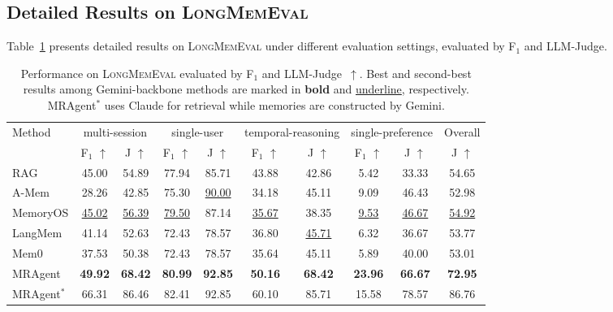 \subsection{Detailed Results on \textsc{LongMemEval}}
Table~\ref{tab:longmem-f1-j-overall} presents detailed results on \textsc{LongMemEval} under different evaluation settings, evaluated by F$_1$ and LLM-Judge.
\label{app:longmem}
\begin{table}[t]
\centering
\small
\setlength{\tabcolsep}{6pt}
\caption{Performance on \textsc{LongMemEval} evaluated by F$_1$ and LLM-Judge~$\uparrow$.
Best and second-best results among Gemini-backbone methods
are marked in \textbf{bold} and \underline{underline}, respectively. MRAgent$^{*}$ uses Claude for retrieval while memories are constructed by Gemini.}
\begin{tabular}{l|cc|cc|cc|cc|c}
\toprule
Method
& \multicolumn{2}{c|}{multi-session}
& \multicolumn{2}{c|}{single-user}
& \multicolumn{2}{c|}{temporal-reasoning}
& \multicolumn{2}{c|}{single-preference}
& Overall \\
& F$_1$ $\uparrow$ & J $\uparrow$
& F$_1$ $\uparrow$ & J $\uparrow$
& F$_1$ $\uparrow$ & J $\uparrow$
& F$_1$ $\uparrow$ & J $\uparrow$
& J $\uparrow$ \\
\midrule
RAG
& 45.00 & 54.89
& 77.94 & 85.71
& 43.88 & 42.86
& 5.42  & 33.33
& 54.65 \\

A-Mem
& 28.26 & 42.85
& 75.30 & \underline{90.00}
& 34.18 & 45.11
& 9.09  & 46.43
& 52.98 \\

MemoryOS
& \underline{45.02} & \underline{56.39}
& \underline{79.50} & 87.14
& \underline{35.67} & 38.35
& \underline{9.53}  & \underline{46.67}
& \underline{54.92} \\

LangMem
& 41.14 & 52.63
& 72.43 & 78.57
& 36.80 & \underline{45.71}
& 6.32  & 36.67
& 53.77 \\

Mem0
& 37.53 & 50.38
& 72.43 & 78.57
& 35.64 & 45.11
& 5.89  & 40.00
& 53.01 \\


MRAgent
& \textbf{49.92} & \textbf{68.42}
& \textbf{80.99} & \textbf{92.85}
& \textbf{50.16} & \textbf{68.42}
& \textbf{23.96} & \textbf{66.67}
& \textbf{72.95} \\
\midrule
MRAgent$^{*}$
& 66.31 & 86.46
& 82.41 & 92.85
& 60.10 & 85.71
& 15.58 & 78.57
& 86.76 \\
\bottomrule
\end{tabular}
\label{tab:longmem-f1-j-overall}
\end{table}



